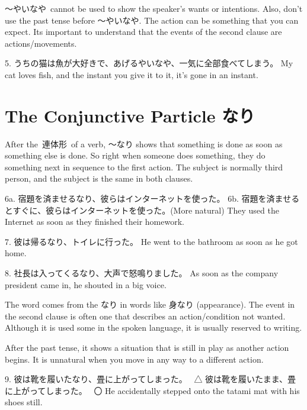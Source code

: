 \par{ ～やいなや cannot be used to show the speaker's wants or intentions. Also, don't use the past tense before ～やいなや. The action can be something that you can expect. It\textquotesingle s important to understand that the events of the second clause are actions\slash movements. }
 
\par{5. うちの猫は魚が大好きで、あげるやいなや、一気に全部食べてしまう。 \hfill\break
My cat loves fish, and the instant you give it to it, it's gone in an instant. }
      
\section{The Conjunctive Particle なり}
 
\par{ After the 連体形 of a verb, ～なり shows that something is done as soon as something else is done. So right when someone does something, they do something next in sequence to the first action. The subject is normally third person, and the subject is the same in both clauses. }

\par{6a. 宿題を済ませるなり、彼らはインターネットを使った。 \hfill\break
6b. 宿題を済ませるとすぐに、彼らはインターネットを使った。(More natural) \hfill\break
They used the Internet as soon as they finished their homework. }

\par{7. 彼は帰るなり、トイレに行った。 \hfill\break
He went to the bathroom as soon as he got home. }

\par{8. 社長は入ってくるなり、大声で怒鳴りました。 \hfill\break
As soon as the company president came in, he shouted in a big voice. }

\par{ The word comes from the なり in words like 身なり (appearance). The event in the second clause is often one that describes an action\slash condition not wanted. Although it is used some in the spoken language, it is usually reserved to writing. }

\par{ After the past tense, it shows a situation that is still in play as another action begins. It is unnatural when you move in any way to a different action. }

\par{9. 彼は靴を履いたなり、畳に上がってしまった。  △ \hfill\break
彼は靴を履いたまま、畳に上がってしまった。  〇 \hfill\break
He accidentally stepped onto the tatami mat with his shoes still. }

